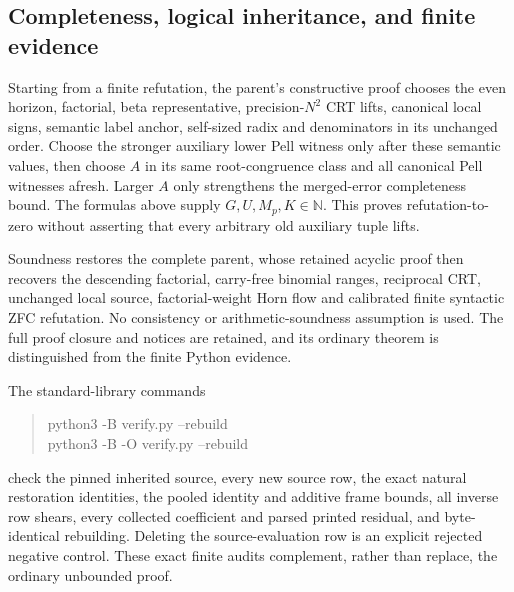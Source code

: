\subsection{Completeness, logical inheritance, and finite evidence}
Starting from a finite refutation, the parent's constructive proof chooses
the even horizon, factorial, beta representative, precision-$N^2$ CRT
lifts, canonical local signs, semantic label anchor, self-sized radix and
denominators in its unchanged order. Choose the stronger auxiliary lower
Pell witness only after these semantic values, then choose $A$ in its same
root-congruence class and all canonical Pell witnesses afresh. Larger $A$
only strengthens the merged-error completeness bound. The formulas above
supply $G,U,M_p,K\in\mathbb N$. This proves refutation-to-zero without
asserting that every arbitrary old auxiliary tuple lifts.

Soundness restores the complete parent, whose retained acyclic proof then
recovers the descending factorial, carry-free binomial ranges, reciprocal
CRT, unchanged local source, factorial-weight Horn flow and calibrated
finite syntactic ZFC refutation. No consistency or arithmetic-soundness
assumption is used. The full proof closure and notices are retained, and
its ordinary theorem is distinguished from the finite Python evidence.

The standard-library commands
\begin{quote}\ttfamily
python3 -B verify.py --rebuild\\
python3 -B -O verify.py --rebuild
\end{quote}
check the pinned inherited source, every new source row, the exact natural
restoration identities, the pooled identity and additive frame bounds,
all inverse row shears, every collected coefficient and parsed printed
residual, and byte-identical rebuilding. Deleting the source-evaluation
row is an explicit rejected negative control. These exact finite audits
complement, rather than replace, the ordinary unbounded proof.
